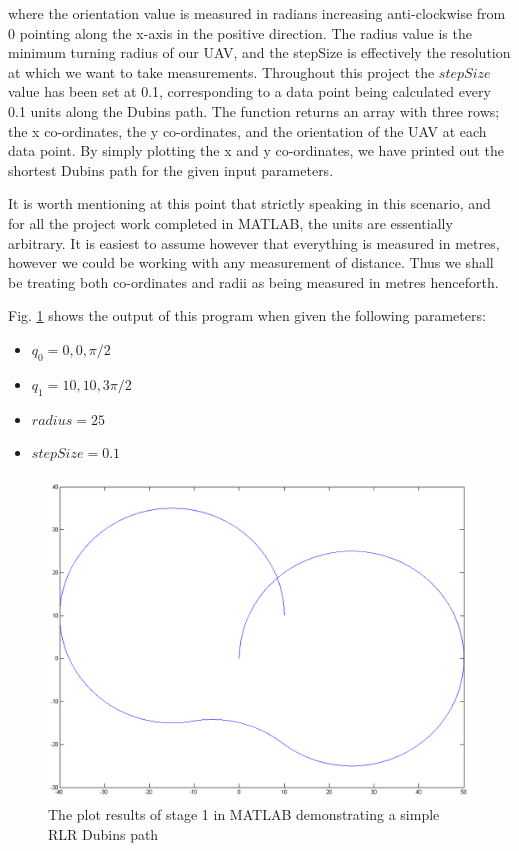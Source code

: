 where the orientation value is measured in radians increasing anti-clockwise from 0 pointing along the x-axis in the positive direction. The radius value is the minimum turning radius of our UAV, and the stepSize is effectively the resolution at which we want to take measurements. Throughout this project the $stepSize$ value has been set at 0.1, corresponding to a data point being calculated every 0.1 units along the Dubins path. The function returns an array with three rows; the x co-ordinates, the y co-ordinates, and the orientation of the UAV at each data point. By simply plotting the x and y co-ordinates, we have printed out the shortest Dubins path for the given input parameters. 

It is worth mentioning at this point that strictly speaking in this scenario, and for all the project work completed in MATLAB, the units are essentially arbitrary. It is easiest to assume however that everything is measured in metres, however we could be working with any measurement of distance. Thus we shall be treating both co-ordinates and radii as being measured in metres henceforth.

Fig. \ref{fig:pp1demo} shows the output of this program when given the following parameters:

\begin{itemize}
	\item $q_0 = 0, 0, \pi/2$
	\item $q_1 = 10, 10, 3\pi/2$
	\item $radius = 25$
	\item $stepSize = 0.1$
\end{itemize}


\begin{figure}[htbp!] 
\centering    
\includegraphics[width=\textwidth]{PP1_Demo}
\caption[stage 1: Plotting Dubins Paths in MATLAB]{The plot results of stage 1 in MATLAB demonstrating a simple RLR Dubins path}
\label{fig:pp1demo}
\end{figure}


